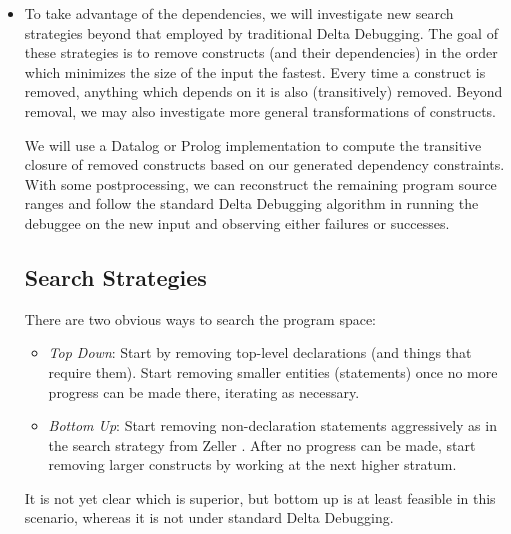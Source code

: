 \documentclass[11pt]{article}
\begin{document}
\begin{itemize}
\item To take advantage of the dependencies, we will investigate new search
  strategies beyond that employed by traditional Delta Debugging.  The goal
  of these strategies is to remove constructs (and their dependencies) in the
  order which minimizes the size of the input the fastest.
  Every time a construct is removed, anything which depends on
  it is also (transitively) removed.  Beyond removal, we may also investigate
  more general transformations of constructs.%

  We will use a Datalog or Prolog implementation to compute the transitive
  closure of removed constructs based on our generated dependency constraints.
  With some postprocessing, we can reconstruct the remaining program source ranges
  and follow the standard Delta Debugging algorithm in running the debuggee on the
  new input and observing either failures or successes.

\subsection{Search Strategies}
There are two obvious ways to search the program space:
\begin{itemize}
\item \emph{Top Down}: Start by removing top-level declarations (and things that
  require them). Start removing smaller entities (statements) once no more
  progress can be made there, iterating as necessary.
\item \emph{Bottom Up}: Start removing non-declaration statements aggressively
  as in the search strategy from Zeller \cite{dd}. After no progress can be made, start
  removing larger constructs by working at the next higher stratum.
\end{itemize}
It is not yet clear which is superior, but bottom up is at least
feasible in this scenario, whereas it is not under standard Delta Debugging.


\end{itemize}
\end{document}
